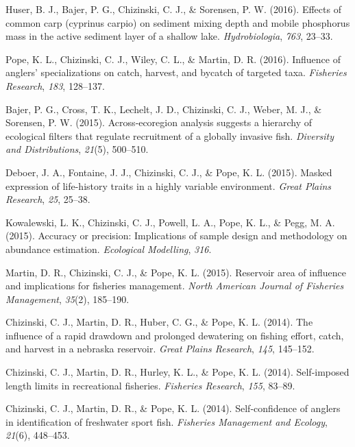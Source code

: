 \documentclass[
  12pt,
]
{article}
\newlength{\cslhangindent}
\newlength{\cslentryspacingunit} %
\newenvironment{CSLReferences}[2] %
 {%
  \setlength{\parindent}{0pt}
  \ifodd #1
  \let\oldpar\par
  \def\par{\hangindent=\cslhangindent\oldpar}
  \fi
  \setlength{\parskip}{#2\cslentryspacingunit}
 }%
 {}
\begin{document}
\begin{CSLReferences}{1}{0}
\leavevmode{}%
Huser, B. J., Bajer, P. G., Chizinski, C. J., \& Sorensen, P. W. (2016).
Effects of common carp (cyprinus carpio) on sediment mixing depth and
mobile phosphorus mass in the active sediment layer of a shallow lake.
\emph{Hydrobiologia}, \emph{763}, 23--33.

\leavevmode{}%
Pope, K. L., Chizinski, C. J., Wiley, C. L., \& Martin, D. R. (2016).
Influence of anglers' specializations on catch, harvest, and bycatch of
targeted taxa. \emph{Fisheries Research}, \emph{183}, 128--137.

\leavevmode{}%
Bajer, P. G., Cross, T. K., Lechelt, J. D., Chizinski, C. J., Weber, M.
J., \& Sorensen, P. W. (2015). Across‐ecoregion analysis suggests a
hierarchy of ecological filters that regulate recruitment of a globally
invasive fish. \emph{Diversity and Distributions}, \emph{21}(5),
500--510.

\leavevmode{}%
Deboer, J. A., Fontaine, J. J., Chizinski, C. J., \& Pope, K. L. (2015).
Masked expression of life-history traits in a highly variable
environment. \emph{Great Plains Research}, \emph{25}, 25--38.

\leavevmode{}%
Kowalewski, L. K., Chizinski, C. J., Powell, L. A., Pope, K. L., \&
Pegg, M. A. (2015). Accuracy or precision: Implications of sample design
and methodology on abundance estimation. \emph{Ecological Modelling},
\emph{316}.

\leavevmode{}%
Martin, D. R., Chizinski, C. J., \& Pope, K. L. (2015). Reservoir area
of influence and implications for fisheries management. \emph{North
American Journal of Fisheries Management}, \emph{35}(2), 185--190.

\leavevmode{}%
Chizinski, C. J., Martin, D. R., Huber, C. G., \& Pope, K. L. (2014).
The influence of a rapid drawdown and prolonged dewatering on fishing
effort, catch, and harvest in a nebraska reservoir. \emph{Great Plains
Research}, \emph{145}, 145--152.

\leavevmode{}%
Chizinski, C. J., Martin, D. R., Hurley, K. L., \& Pope, K. L. (2014).
Self-imposed length limits in recreational fisheries. \emph{Fisheries
Research}, \emph{155}, 83--89.

\leavevmode{}%
Chizinski, C. J., Martin, D. R., \& Pope, K. L. (2014). Self‐confidence
of anglers in identification of freshwater sport fish. \emph{Fisheries
Management and Ecology}, \emph{21}(6), 448--453.


\end{CSLReferences}
\end{document}
